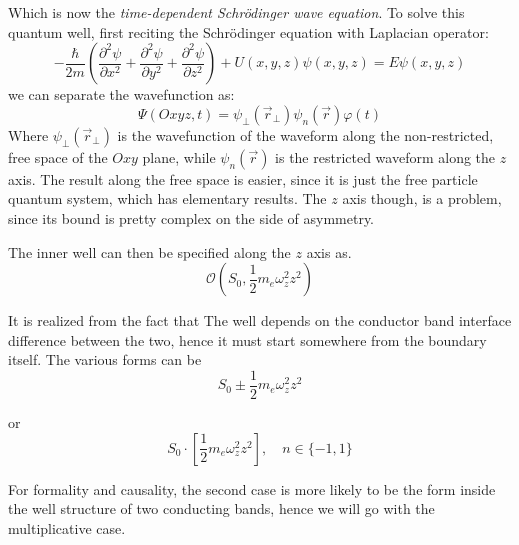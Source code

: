 Which is now the \textit{time-dependent Schrödinger wave equation}. To solve this quantum well, first reciting the Schrödinger equation with Laplacian operator: 
\begin{equation}
  -\frac{\hbar}{2m}\left( \frac{\partial^{2}\psi}{\partial x^{2}} + \frac{\partial^{2}\psi}{\partial y^{2}} + \frac{\partial^{2}\psi}{\partial z^{2}} \right)+ U(x,y,z)\psi(x,y,z)= E\psi(x,y,z)
\end{equation}
we can separate the wavefunction as: 
\begin{equation}
  \Psi(Oxyz, t)=\psi_{\perp}(\vec{r}_{\perp})\psi_{n}(\vec{r})\varphi(t)
\end{equation}
Where $\psi_{\perp}(\vec{r}_{\perp})$ is the wavefunction of the waveform along the non-restricted, free space of the $Oxy$ plane, while $\psi_{n}(\vec{r})$ is the restricted waveform along the $z$ axis. The result along the free space is easier, since it is just the free particle quantum system, which has elementary results. The $z$ axis though, is a problem, since its bound is pretty complex on the side of asymmetry. 

The inner well can then be specified along the $z$ axis as.
\begin{equation}
    \mathcal{O}\left(S_{0},\displaystyle{\frac{1}{2}m_{e}\omega_{z}^{2}z^{2}}\right)
\end{equation}

It is realized from the fact that The well depends on the conductor band interface difference between the two, hence it must start somewhere from the boundary itself. The various forms can be 
\begin{equation}
    S_{0} \pm \frac{1}{2}m_{e}\omega_{z}^{2}z^{2}
\end{equation}

or \begin{equation}
    S_{0}\cdot \left[\frac{1}{2}m_{e}\omega_{z}^{2}z^{2}\right], \quad n \in \{ -1, 1 \}
\end{equation}

For formality and causality, the second case is more likely to be the form inside the well structure of two conducting bands, hence we will go with the multiplicative case. 

